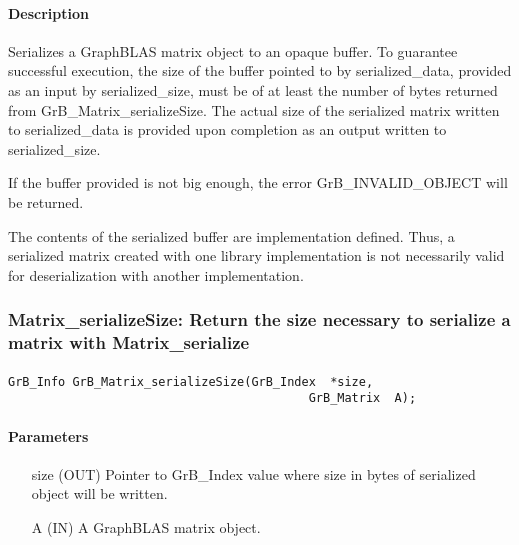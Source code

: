 \paragraph{Description}

Serializes a GraphBLAS matrix object to an opaque buffer.  To guarantee
successful execution, the size of the buffer pointed to by {\sf serialized\_data},
provided as an input by {\sf serialized\_size}, must be of at least the number
of bytes returned from {\sf GrB\_Matrix\_serializeSize}.  The actual size of the
serialized matrix written to {\sf serialized\_data} is provided upon completion
as an output written to {\sf serialized\_size}.

If the buffer provided is not big enough, the error {\sf GrB\_INVALID\_OBJECT}
will be returned.

The contents of the serialized buffer are implementation defined.  Thus, a
serialized matrix created with one library implementation is not necessarily
valid for deserialization with another implementation.


\subsubsection{{\sf Matrix\_serializeSize}: Return the size necessary to serialize a matrix with {\sf Matrix\_serialize} }
\label{Sec:Matrix_serializeSize}

\paragraph{\syntax}

\begin{Verbatim}[samepage=true]
        GrB_Info GrB_Matrix_serializeSize(GrB_Index  *size,
                                          GrB_Matrix  A);
\end{Verbatim}

\paragraph{Parameters}

\begin{itemize}[leftmargin=1.1in]
    \item[{\sf size}] ({\sf OUT}) Pointer to {\sf GrB\_Index} value where size in bytes of serialized object will be written.
    \item[{\sf A}]      ({\sf IN}) A GraphBLAS matrix object.
\end{itemize}

